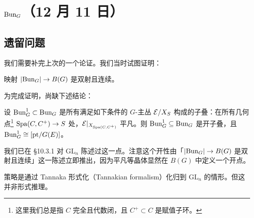 \section[$\Bun_G$]{$\Bun_G$（12 月 11 日）}


\subsection{遗留问题}

我们需要补完上次的一个论证。我们当时试图证明：

\begin{theorem}
映射 $|\mathrm{Bun}_G|\to B(G)$ 是双射且连续。
\end{theorem}

为完成证明，尚缺下述结论：

\begin{theorem}
设 $\mathrm{Bun}^1_G\subset\mathrm{Bun}_G$ 是所有满足如下条件的 $G$-主丛 $\mathcal{E}/X_S$ 构成的子叠：在所有几何点\footnote{这里我们总是指 $C$ 完全且代数闭，且 $C^+\subset C$ 是赋值子环。} $\operatorname{Spa}(C,C^+)\to S$ 处，$\mathcal{E}|_{X_{\operatorname{Spa}(C,C^+)}}$ 平凡。则 $\mathrm{Bun}^1_G\subseteq\mathrm{Bun}_G$ 是开子叠，且 $\mathrm{Bun}^1_G\cong[\mathrm{pt}/G(E)]$。
\end{theorem}

\begin{remark}
我们已在 §10.3.1 对 $\mathrm{GL}_n$ 陈述过这一点。注意这个开性由「$|\mathrm{Bun}_G|\to B(G)$ 是双射且连续」这一陈述立即推出，因为平凡等晶体显然在 $B(G)$ 中定义一个开点。
\end{remark}

策略是通过 Tannaka 形式化（Tannakian formalism）化归到 $\mathrm{GL}_n$ 的情形。但这并非形式推理。

